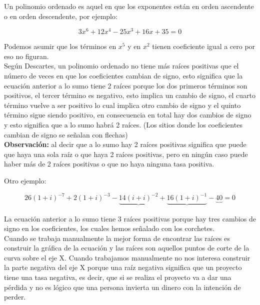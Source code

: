 Un polinomio ordenado es aquel en que los exponentes están en orden ascendente o en orden descendente, por ejemplo: \\
\begin{center}
	\begin{equation*}
		3x^{6}+12x^{4}-25x^{3}+16x+35=0
	\end{equation*}
\end{center}

Podemos asumir que los términos en $x^{5}$  y en $x^{2}$ tienen coeficiente igual a cero por eso no figuran. \\

Según Descartes, un polinomio ordenado no tiene más raíces positivas que el número de veces en que los coeficientes cambian de signo, esto significa que la ecuación anterior a lo sumo tiene 2 raíces porque los dos primeros términos son positivos, el tercer término es negativo, esto implica un cambio de signo, el cuarto término vuelve a ser positivo lo cual implica otro cambio de signo y el quinto término sigue siendo positivo, en consecuencia en total hay dos cambios de signo y esto significa que a lo sumo habrá 2 raíces. (Los sitios donde los coeficientes cambian de signo se señalan con flechas)\\

\textbf{Observación:} al decir que a lo sumo hay 2 raíces positivas significa que puede que haya una sola raíz o que haya 2 raíces positivas, pero en ningún caso puede haber más de 2 raíces positivas o que no haya ninguna tasa positiva.

Otro ejemplo:\\
\begin{center}
	\begin{equation*}
		26(1+i)^{-7}+2(1+i)^{-3}-\underbrace{14(i+i)^{-2}}_{}+\underbrace{16(1+i)^{-1}}_{}-\underbrace{40}_{}=0
	\end{equation*}
\end{center}

La ecuación anterior a lo sumo tiene 3 raíces positivas porque hay tres cambios de signo en los coeficientes, los cuales hemos señalado con los corchetes. \\

Cuando se trabaja manualmente la mejor forma de encontrar las raíces es construir la gráfica de la ecuación y las raíces son aquellos puntos de corte de la curva sobre el eje X. Cuando trabajamos manualmente no nos interesa construir la parte negativa del eje X porque una raíz negativa significa que un proyecto tiene una tasa negativa, es decir, que si se realiza el proyecto va a dar una pérdida y no es lógico que una persona invierta un dinero con la intención de perder. \\


